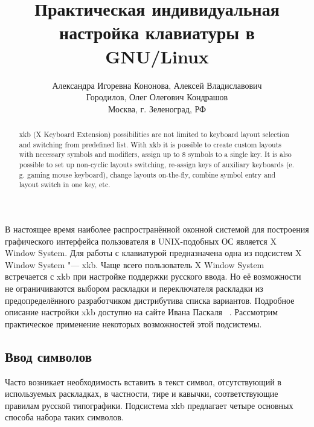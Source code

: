 \documentclass[10pt, a5paper]{article}
\begin{document}
\title{Практическая индивидуальная настройка клавиатуры в GNU/Linux}
\author{Александра Игоревна Кононова, Алексей Владиславович \\ Городилов, Олег Олегович Кондрашов \\ Москва, г. Зеленоград, РФ}
\maketitle
\begin{abstract}
xkb (X Keyboard Extension) possibilities are not limited to keyboard layout selection and switching from predefined list.
With xkb it is possible to create custom layouts with necessary symbols and modifiers, assign up to 8 symbols to a single key. It is also possible to set up non-cyclic layouts switching, re-assign keys of auxiliary keyboards (e. g. gaming mouse keyboard), change layouts on-the-fly, combine symbol entry and layout switch in one key, etc.
\end{abstract}

В настоящее время наиболее распространённой оконной системой для построения графического интерфейса пользователя в UNIX-подобных ОС является X Window System. Для работы с клавиатурой предназначена одна из подсистем X Window System "--- xkb. 
Чаще всего пользователь X Window System встречается с xkb при настройке поддержки русского ввода. Но её возможности не ограничиваются выбором раскладки и переключателя раскладки из предопределённого разработчиком дистрибутива списка вариантов. Подробное описание настройки xkb доступно на сайте Ивана Паскаля ~\cite{Kononova1}. Рассмотрим практическое применение некоторых возможностей этой подсистемы.

\subsection*{Ввод символов}

Часто возникает необходимость вставить в текст символ, отсутствующий в используемых раскладках, в частности, тире и кавычки, соответствующие правилам русской типографики. Подсистема xkb предлагает четыре основных способа набора таких символов.
\end{document}
